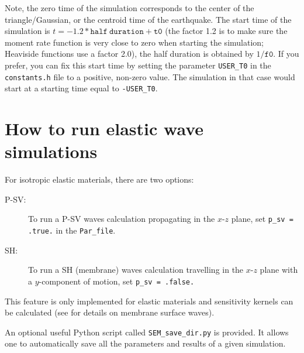 Note, the zero time of the simulation corresponds to the center of the triangle/Gaussian,
or the centroid time of the earthquake. The start time of the simulation
is $t=-1.2*\mathtt{half~duration} + \mathtt{t0}$ (the factor 1.2 is to make sure the moment
rate function is very close to zero when starting the simulation; Heaviside functions use a factor 2.0),
the half duration is obtained by $1/\mathtt{f0}$.
If you prefer, you can fix this start time by setting the parameter \texttt{USER\_T0} in the \texttt{constants.h} file
to a positive, non-zero value. The simulation in that case would start at a starting time equal to \texttt{-USER\_T0}.


\section{How to run elastic wave simulations}

For isotropic elastic materials, there are two options:
%
\begin{description}
\item[P-SV:]
To run a P-SV waves calculation propagating in the $x$-$z$ plane,
set \texttt{p\_sv = .true.} in the \texttt{Par\_file}.

\item[SH:]
To run a SH (membrane) waves calculation travelling in the $x$-$z$ plane with a
$y$-component of motion, set \texttt{p\_sv = .false.}

\end{description}
%
This feature is only implemented for elastic materials and sensitivity kernels
can be calculated (see \cite{TaLiTr07} for details on membrane
surface waves).

An optional useful Python script called \texttt{SEM\_save\_dir.py} is provided.
It allows one to automatically save all the parameters and results of a given simulation.

